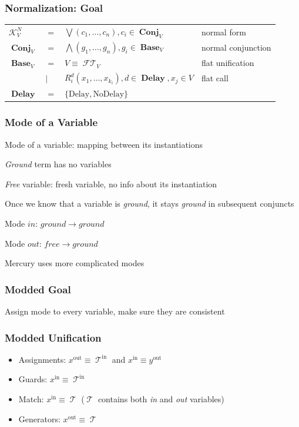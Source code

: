 \documentclass[xcolor=table]{beamer}
\DeclareMathOperator{\Term}{\mathcal{T}}
\DeclareMathOperator{\FlatTerm}{\mathcal{FT}}
\DeclareMathOperator{\Delay}{\mathbf{Delay}}
\DeclareMathOperator{\Base}{\mathbf{Base}}
\DeclareMathOperator{\Conj}{\mathbf{Conj}}
\DeclareMathOperator{\inmode}{in}
\DeclareMathOperator{\outmode}{out}
\newcommand{\KanN}{\mathcal{K}^{N}}
\begin{document}
\begin{frame}[fragile]
  \frametitle{Normalization: Goal}
\begin{tabular}{llll}
$\KanN_{V}$ & $=$ & $\bigvee\left( c_1, \ldots, c_{n} \right), c_{i}\in \Conj_{V}$ & normal form \\
$\Conj_{V}$ & $=$ & $\bigwedge\left( g_1, \ldots, g_n \right), g_{i}\in \Base_{V}$ & normal conjunction \\
$\Base_{V}$ & $=$ & $V \equiv \FlatTerm_{V}$ & flat unification \\
            & $\mid$ & $R_{i}^{d}\left( x_1, \ldots, x_{k_{i}} \right), d\in \Delay, x_{j}\in V$ & flat call\\

$\Delay$ & $=$ &  $\{\text{Delay}, \text{NoDelay}\} $ &
\end{tabular}
\end{frame}


\begin{frame}[fragile]
  \frametitle{Mode of a Variable}
Mode of a variable: mapping between its instantiations

\vfill

\emph{Ground} term has no variables

\emph{Free} variable: fresh variable, no info about its instantiation

Once we know that a variable is \emph{ground}, it stays \emph{ground} in subsequent conjuncts

\vfill

Mode $in$: $ground \rightarrow ground$

Mode $out$: $free \rightarrow ground$

\vfill

Mercury uses more complicated modes

\end{frame}

\begin{frame}[fragile]
  \frametitle{Modded Goal}
Assign mode to every variable, make sure they are consistent
\end{frame}

\begin{frame}[fragile]
  \frametitle{Modded Unification}

\begin{itemize}
    \item Assignments: $x^{\outmode}  \equiv \Term^{\inmode}$ and $x^{\inmode} \equiv y^{\outmode}$
    \item Guards: $x^{\inmode} \equiv \Term^{\inmode}$
    \item Match: $x^{\inmode} \equiv \Term$ ($\Term$ contains both \emph{in} and \emph{out} variables)
    \item Generators: $x^{\outmode} \equiv \Term$
\end{itemize}
\end{frame}
\end{document}
